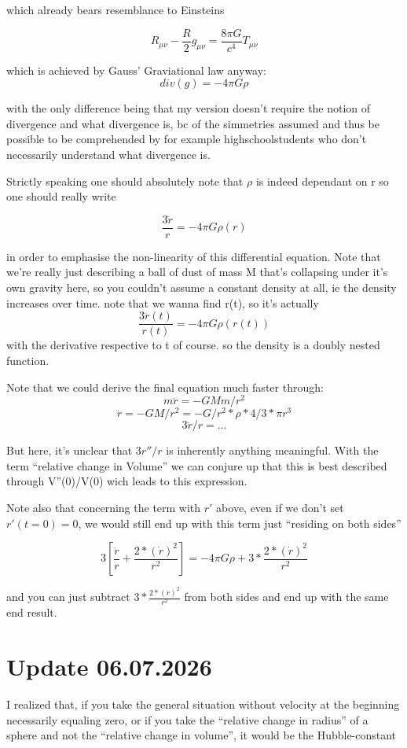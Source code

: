 \documentclass{article}
\begin{document}
which already bears resemblance to Einsteins

$$R_{\mu \nu} - \frac{R}{2} g_{\mu \nu} = \frac{8\pi G}{c^4} T_{\mu \nu}$$

which is achieved by Gauss' Graviational law anyway:
$$div(g)= -4\pi G \rho$$

with the only difference being that my version doesn't require the notion of divergence and what divergence is, bc of the simmetries assumed and thus be possible to be comprehended by for example highschoolstudents who don't necessarily understand what divergence is.

Strictly speaking one should absolutely note that $\rho$ is indeed dependant on r so one should really write 

$$\frac{3\ddot{r} }{r}= -4\pi G \rho (r)$$

in order to  emphasise the non-linearity of this differential equation. 
Note that we're really just describing a ball of dust of mass M that's collapsing under it's own gravity here, so you couldn't assume a constant density at all, ie the density increases over time.
note that we wanna find r(t), so it's actually 
$$\frac{3 \ddot{r}(t) }{r(t)}= -4\pi G \rho (r(t))$$
with the derivative respective to t of course. so the density is a doubly nested function.

Note that we could derive the final equation much faster through:
$$m \ddot{r} = - GMm/r^2$$
$$ \ddot{r} = -GM/r^2 = -G/r^2 * \rho * 4/3 * \pi r^3$$
$$3 \ddot{r}/r = ...$$

But here, it's unclear that $3r''/r$ is inherently anything meaningful. With the term ``relative change in Volume'' we can conjure up that this is best described through V''(0)/V(0) wich leads to this expression.

Note also that concerning the term with $r'$ above, even if we don't set $r'(t=0) =0$, we would still end up with this term just ``residing on both sides'' 

$$3 [\frac{ \ddot{r}}{r} + \frac{2*( \dot{r})^2}{r^2}]=-4 \pi G  \rho + 3 * \frac{2*( \dot{r})^2}{r^2}$$

and you can just subtract $3 * \frac{2*( \dot{r})^2}{r^2}$ from both sides and end up with the same end result.


\section{ Update 06.07.2026 }

I realized that, if you take the general situation without velocity at the beginning necessarily equaling zero, or if you take the ``relative change in radius'' of a sphere and not the ``relative change in volume'', it would be the Hubble-constant
\end{document}

